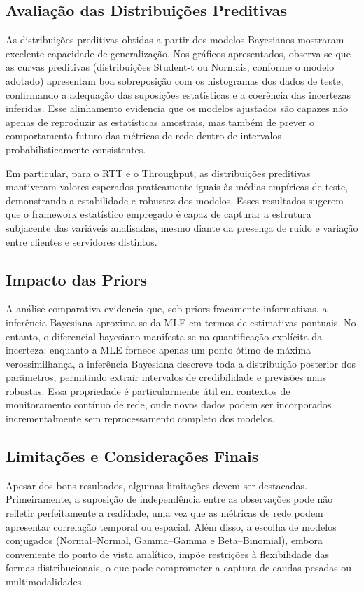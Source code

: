 \documentclass{article}
\begin{document}
\subsection{Avaliação das Distribuições Preditivas}

As distribuições preditivas obtidas a partir dos modelos Bayesianos mostraram
excelente capacidade de generalização.
Nos gráficos apresentados, observa-se que as curvas preditivas (distribuições Student-t ou
Normais, conforme o modelo adotado) apresentam boa sobreposição com os histogramas
dos dados de teste, confirmando a adequação das suposições estatísticas e a coerência
das incertezas inferidas.  
Esse alinhamento evidencia que os modelos ajustados são capazes não apenas de reproduzir
as estatísticas amostrais, mas também de prever o comportamento futuro das métricas de rede
dentro de intervalos probabilisticamente consistentes.

Em particular, para o RTT e o Throughput, as distribuições preditivas mantiveram
valores esperados praticamente iguais às médias empíricas de teste,
demonstrando a estabilidade e robustez dos modelos.  
Esses resultados sugerem que o framework estatístico empregado é capaz de
capturar a estrutura subjacente das variáveis analisadas, mesmo diante da
presença de ruído e variação entre clientes e servidores distintos.

\subsection{Impacto das Priors}

A análise comparativa evidencia que, sob priors fracamente informativas,
a inferência Bayesiana aproxima-se da MLE em termos de estimativas pontuais.
No entanto, o diferencial bayesiano manifesta-se na quantificação explícita da incerteza:
enquanto a MLE fornece apenas um ponto ótimo de máxima verossimilhança,
a inferência Bayesiana descreve toda a distribuição posterior dos parâmetros,
permitindo extrair intervalos de credibilidade e previsões mais robustas.
Essa propriedade é particularmente útil em contextos de monitoramento contínuo de rede,
onde novos dados podem ser incorporados incrementalmente sem reprocessamento completo
dos modelos.

\subsection{Limitações e Considerações Finais}

Apesar dos bons resultados, algumas limitações devem ser destacadas.
Primeiramente, a suposição de independência entre as observações pode não refletir
perfeitamente a realidade, uma vez que as métricas de rede podem apresentar correlação
temporal ou espacial.  
Além disso, a escolha de modelos conjugados (Normal–Normal, Gamma–Gamma e Beta–Binomial),
embora conveniente do ponto de vista analítico, impõe restrições à flexibilidade das formas
distribucionais, o que pode comprometer a captura de caudas pesadas ou multimodalidades.
\end{document}
